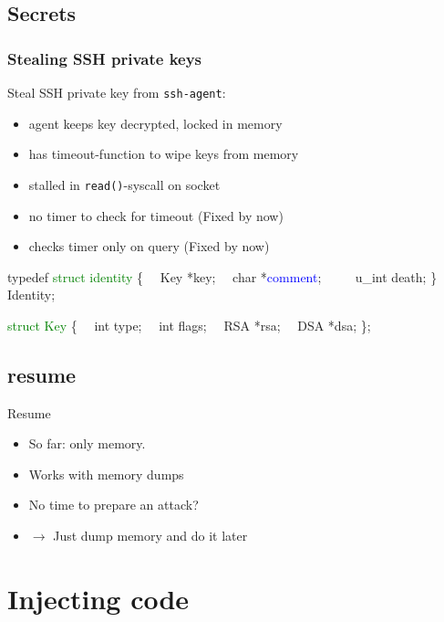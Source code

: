 \documentclass{beamer}
\newenvironment{itemizeframe}[1]
  {\begin{frame}{#1}\startitemizeframe}
  {\stopitemizeframe\end{frame}}
\newcommand\startitemizeframe{\begin{itemize}}
\newcommand\stopitemizeframe{\end{itemize}}
\begin{document}
	\subsection{Secrets}

		\begin{frame} \frametitle{Stealing SSH private keys}

			Steal SSH private key from \texttt{ssh-agent}:

			\begin{itemize}
				\item agent keeps key decrypted, locked in memory
				\item has timeout-function to wipe keys from memory
				\item stalled in \texttt{read()}-syscall on socket
				\item \alert{no timer} to check for timeout (Fixed by now)
				\item checks timer only on query (Fixed by now)
			\end{itemize}
		\end{frame}

		\begin{frame}[fragile]
			\begin{semiverbatim}
				typedef \textcolor{green}{struct identity} \{
				\ \ 	Key *key;
				\ \ 	char *\textcolor{blue}{comment};  
				\ \           
				\ \ 	u_int death;
				\} Identity;

				\textcolor{green}{struct Key} \{
				\ \ 	int      type;
				\ \ 	int      flags;
				\ \ 	RSA     *rsa;
				\ \ 	DSA     *dsa;
				\};
			\end{semiverbatim}
		\end{frame}

	\subsection{resume}

		\begin{itemizeframe}{Resume}
			\item So far: only  memory.
			\item Works with memory dumps
			\item No time to prepare an attack?
			\item $\rightarrow$ Just dump memory and do it later
		\end{itemizeframe}

\section{Injecting code}
\end{document}

